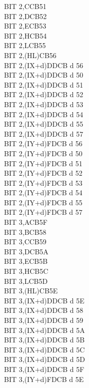 \documentclass[12pt,twoside,openright,a4paper]{book}
\begin{document}
\begin{multicols}{3}
{\begin{tabbing}
		BIT 2,C\>CB51\\
		BIT 2,D\>CB52\\
		BIT 2,E\>CB53\\
		BIT 2,H\>CB54\\
		BIT 2,L\>CB55\\
		BIT 2,(HL)\>CB56\\
		BIT 2,(IX+d)\>DDCB d 56\\
		BIT 2,(IX+d)\UNDOC\>DDCB d 50\\
		BIT 2,(IX+d)\UNDOC\>DDCB d 51\\
		BIT 2,(IX+d)\UNDOC\>DDCB d 52\\
		BIT 2,(IX+d)\UNDOC\>DDCB d 53\\
		BIT 2,(IX+d)\UNDOC\>DDCB d 54\\
		BIT 2,(IX+d)\UNDOC\>DDCB d 55\\
		BIT 2,(IX+d)\UNDOC\>DDCB d 57\\
		BIT 2,(IY+d)\>FDCB d 56\\
		BIT 2,(IY+d)\UNDOC\>FDCB d 50\\
		BIT 2,(IY+d)\UNDOC\>FDCB d 51\\
		BIT 2,(IY+d)\UNDOC\>FDCB d 52\\
		BIT 2,(IY+d)\UNDOC\>FDCB d 53\\
		BIT 2,(IY+d)\UNDOC\>FDCB d 54\\
		BIT 2,(IY+d)\UNDOC\>FDCB d 55\\
		BIT 2,(IY+d)\UNDOC\>FDCB d 57\\
		BIT 3,A\>CB5F\\
		BIT 3,B\>CB58\\
		BIT 3,C\>CB59\\
		BIT 3,D\>CB5A\\
		BIT 3,E\>CB5B\\
		BIT 3,H\>CB5C\\
		BIT 3,L\>CB5D\\
		BIT 3,(HL)\>CB5E\\
		BIT 3,(IX+d)\>DDCB d 5E\\
		BIT 3,(IX+d)\UNDOC\>DDCB d 58\\
		BIT 3,(IX+d)\UNDOC\>DDCB d 59\\
		BIT 3,(IX+d)\UNDOC\>DDCB d 5A\\
		BIT 3,(IX+d)\UNDOC\>DDCB d 5B\\
		BIT 3,(IX+d)\UNDOC\>DDCB d 5C\\
		BIT 3,(IX+d)\UNDOC\>DDCB d 5D\\
		BIT 3,(IX+d)\UNDOC\>DDCB d 5F\\
		BIT 3,(IY+d)\>FDCB d 5E\\

\end{tabbing}}
\end{multicols}
\end{document}
